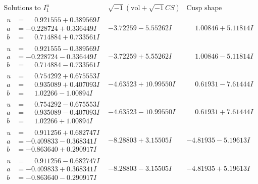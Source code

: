 \documentclass[1p]{elsarticle_modified}
\theoremstyle{definition}
\newcommand{\I}{\sqrt{-1}}
\begin{document}
$$\begin{array}{c|c|c}  
\text{Solutions to }I^u_{1}& \I (\text{vol} + \sqrt{-1}CS) & \text{Cusp shape}\\
 \hline 
\begin{aligned}
u &= \phantom{-}0.921555 + 0.389569 I \\
a &= -0.228724 + 0.336449 I \\
b &= \phantom{-}0.714884 + 0.733561 I\end{aligned}
 & -3.72259 - 5.55262 I & \phantom{-}1.00846 + 5.11814 I \\ \hline\begin{aligned}
u &= \phantom{-}0.921555 - 0.389569 I \\
a &= -0.228724 - 0.336449 I \\
b &= \phantom{-}0.714884 - 0.733561 I\end{aligned}
 & -3.72259 + 5.55262 I & \phantom{-}1.00846 - 5.11814 I \\ \hline\begin{aligned}
u &= \phantom{-}0.754292 + 0.675553 I \\
a &= \phantom{-}0.935089 + 0.407093 I \\
b &= \phantom{-}1.02266 - 1.00894 I\end{aligned}
 & -4.63523 + 10.99550 I & \phantom{-}0.61931 - 7.61444 I \\ \hline\begin{aligned}
u &= \phantom{-}0.754292 - 0.675553 I \\
a &= \phantom{-}0.935089 - 0.407093 I \\
b &= \phantom{-}1.02266 + 1.00894 I\end{aligned}
 & -4.63523 - 10.99550 I & \phantom{-}0.61931 + 7.61444 I \\ \hline\begin{aligned}
u &= \phantom{-}0.911256 + 0.682747 I \\
a &= -0.409833 - 0.368341 I \\
b &= -0.863640 + 0.290917 I\end{aligned}
 & -8.28803 + 3.15505 I & -4.81935 - 5.19613 I \\ \hline\begin{aligned}
u &= \phantom{-}0.911256 - 0.682747 I \\
a &= -0.409833 + 0.368341 I \\
b &= -0.863640 - 0.290917 I\end{aligned}
 & -8.28803 - 3.15505 I & -4.81935 + 5.19613 I \\ \hline\begin{aligned}

\end{aligned}
\end{array}$$
\end{document}
